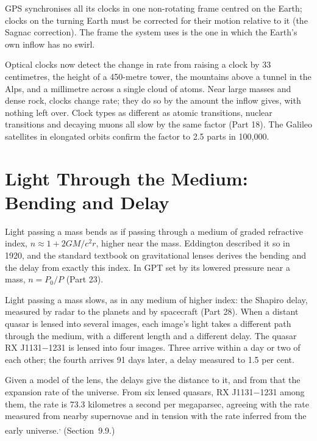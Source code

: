  GPS synchronises all its clocks in one non-rotating frame centred on the Earth; clocks on the turning Earth must be corrected for their motion relative to it (the Sagnac correction). The frame the system uses is the one in which the Earth's own inflow has no swirl.

 Optical clocks now detect the change in rate from raising a clock by 33 centimetres, the height of a 450-metre tower, the mountains above a tunnel in the Alps, and a millimetre across a single cloud of atoms. Near large masses and dense rock, clocks change rate; they do so by the amount the inflow gives, with nothing left over. Clock types as different as atomic transitions, nuclear transitions and decaying muons all slow by the same factor (Part 18). The Galileo satellites in elongated orbits confirm the factor to 2.5 parts in 100,000.

\section{Light Through the Medium: Bending and Delay}

 Light passing a mass bends as if passing through a medium of graded refractive index, $n \approx 1 + 2GM/c^2 r$, higher near the mass. Eddington described it so in 1920, and the standard textbook on gravitational lenses derives the bending and the delay from exactly this index. In GPT  set by its lowered pressure near a mass, $n = P_0/P$ (Part 23).

 Light passing a mass slows, as in any medium of higher index: the Shapiro delay, measured by radar to the planets and by spacecraft (Part 28). When a distant quasar is lensed into several images, each image's light takes a different path through the medium, with a different length and a different delay. The quasar RX J1131$-$1231 is lensed into four images. Three arrive within a day or two of each other; the fourth arrives 91 days later, a delay measured to 1.5 per cent.

 Given a model of the lens, the delays give the distance to it, and from that the expansion rate of the universe. From six lensed quasars, RX J1131$-$1231 among them, the rate is 73.3 kilometres a second per megaparsec, agreeing with the rate measured from nearby supernovae and in tension with the rate inferred from the early universe.\textsuperscript{,} (Section~9.9.)

